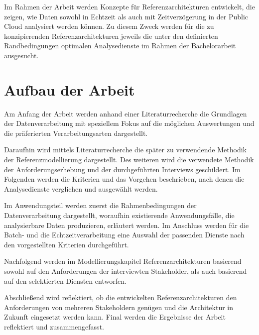 Im Rahmen der Arbeit werden Konzepte für Referenzarchitekturen entwickelt, die zeigen, wie Daten sowohl in Echtzeit als auch mit Zeitverzögerung in der Public Cloud analysiert werden können. 
Zu diesem Zweck werden für die zu konzipierenden Referenzarchitekturen jeweils die unter den definierten Randbedingungen optimalen Analysedienste im Rahmen der Bachelorarbeit ausgesucht.

\section{Aufbau der Arbeit}\label{section:Aufbau-der-Arbei}

Am Anfang der Arbeit werden anhand einer Literaturrecherche die Grundlagen der Datenverarbeitung mit speziellem Fokus auf die möglichen Auswertungen und die präferierten Verarbeitungsarten dargestellt. 

Daraufhin wird mittels Literaturrecherche die später zu verwendende Methodik der Referenzmodellierung dargestellt. 
Des weiteren wird die verwendete Methodik der Anforderungserhebung und der durchgeführten Interviews geschildert. 
Im Folgenden werden die Kriterien und das Vorgehen beschrieben, nach denen die Analysedienste verglichen und ausgewählt werden. 

Im Anwendungsteil werden zuerst die Rahmenbedingungen der Datenverarbeitung dargestellt, woraufhin existierende Anwendungsfälle, die analysierbare Daten produzieren, erläutert werden. 
Im Anschluss werden für die Batch- und die Echtzeitverarbeitung eine Auswahl der passenden Dienste nach den vorgestellten Kriterien durchgeführt. 

Nachfolgend werden im Modellierungskapitel Referenzarchitekturen basierend sowohl auf den Anforderungen der interviewten Stakeholder, als auch basierend auf den selektierten Diensten entworfen. 

Abschließend wird reflektiert, ob die entwickelten Referenzarchitekturen den Anforderungen von mehreren Stakeholdern genügen und die Architektur in Zukunft eingesetzt werden kann. Final werden die Ergebnisse der Arbeit reflektiert und zusammengefasst.

